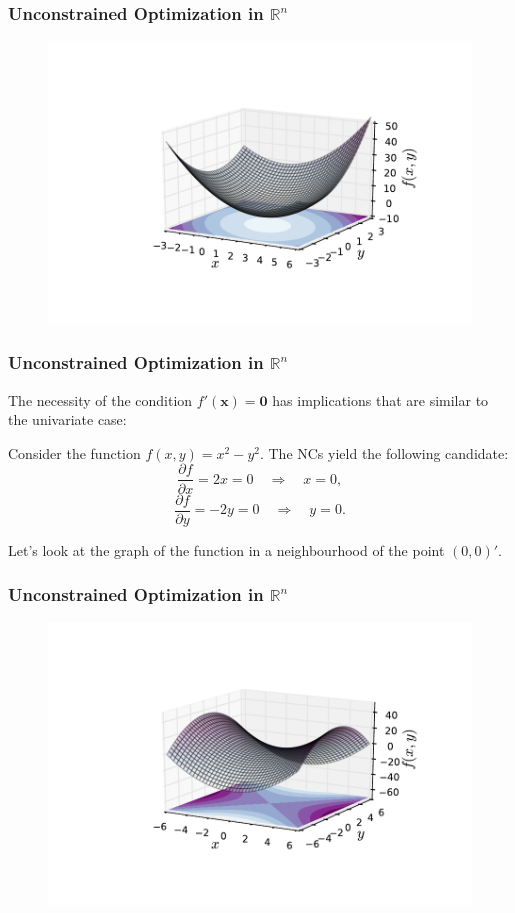 \documentclass[10pt]{beamer}
\theoremstyle{definition}
\begin{document}
\begin{frame}[fragile]
\frametitle{Unconstrained Optimization in $ \mathbb{R}^n $}
\begin{figure}
\centering
\includegraphics[width=0.9\linewidth]{quadformplot}
\label{fig:quadformplot}
\end{figure}
\end{frame}

\begin{frame}[fragile]
\frametitle{Unconstrained Optimization in $ \mathbb{R}^n $}
The necessity of the condition $  f'(\mathbf{x}) = \mathbf{0} $ has implications that are similar to the univariate case:

\begin{example}
Consider the function $ f(x,y) = x^2 - y^2 $. The NCs yield the following candidate: \[ \frac{\partial f}{\partial x} = 2x = 0\quad \Rightarrow \quad x=0, \]
\[ \frac{\partial f}{\partial y} = -2y = 0\quad \Rightarrow \quad y = 0.\] \bigskip

Let's look at the graph of the function in a neighbourhood of the point $ (0,0)' $.
\label{ex:saddle}
\end{example}
\end{frame}

\begin{frame}[fragile]
\frametitle{Unconstrained Optimization in $ \mathbb{R}^n $}
\begin{figure}
\centering
\includegraphics[width=0.9\linewidth]{saddlepoint}
\label{fig:saddlepoint}
\end{figure}
\end{frame}
\end{document}
